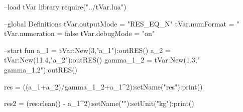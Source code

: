 \documentclass{article}
\begin{document}
\begin{luacode}
	--load tVar library
	require("../tVar.lua")
	
	--global Definitions
	tVar.outputMode = "RES_EQ_N"
	tVar.numFormat = "%
	tVar.numeration = false
	tVar.debugMode = "on"
	
	
	--start fun
	a_1 = tVar:New(3,"a_1"):outRES()
	a_2 = tVar:New(11.4,"a_2"):outRES()
	gamma_1_2 = tVar:New(1.3,"\\gamma_{1,2}"):outRES()
	
	res = ((a_1+a_2)/gamma_1_2+a_1^2):setName("res"):print()
	
	res2 = (res:clean() - a_1^2):setName(""):setUnit("kg"):print()
\end{luacode}
\end{document}
